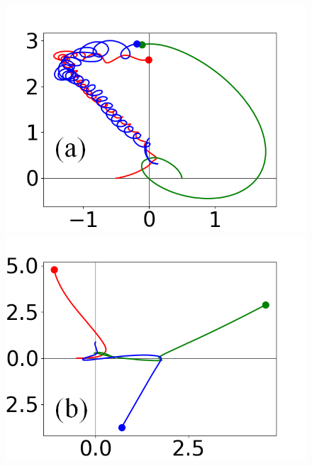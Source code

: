 \documentclass[%
 reprint,
 amsmath,amssymb,
 aps,
]{revtex4-2}
\begin{document}
\begin{figure}
\centering
    \begin{minipage}{0.15723\textwidth}
        \centering
        \includegraphics[width=\linewidth]{threebodies_15_marked.png}
    \end{minipage}
    \hfill
    \begin{minipage}{0.15723\textwidth}
        \centering
        \includegraphics[width=\linewidth]{threebodies_14_marked.png}
    \end{minipage}
    \hfill
    \begin{minipage}{0.15723\textwidth}
        \centering

\end{minipage}
\end{figure}
\end{document}

